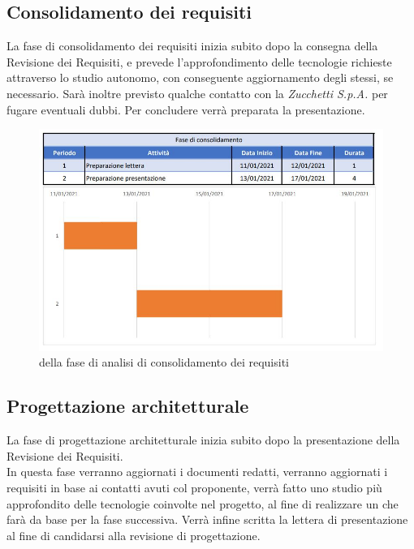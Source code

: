 \documentclass[../piano_di_progetto.tex]{subfiles}
\begin{document}
\subsection{Consolidamento dei requisiti}%
\label{sub:cons_req}
La fase di consolidamento dei requisiti inizia subito dopo la consegna della Revisione dei Requisiti, e prevede l’approfondimento delle tecnologie richieste attraverso lo studio autonomo, con conseguente aggiornamento degli stessi, se necessario. Sarà inoltre previsto qualche contatto con la \emph{Zucchetti S.p.A.} per fugare eventuali dubbi. Per concludere verrà preparata la presentazione. 
\begin{figure}[H]
\centering
\includegraphics[width=12cm]{componenti/img/fase_consolid}
\caption{  della fase di analisi di consolidamento dei requisiti}
\end{figure}

\subsection{Progettazione architetturale}%
\label{sub:prog_arc}
La fase di progettazione architetturale inizia subito dopo la presentazione della Revisione dei Requisiti.\\
In questa fase verranno aggiornati i documenti redatti, verranno aggiornati i requisiti in base ai contatti avuti col proponente, verrà fatto uno studio più approfondito delle tecnologie coinvolte nel progetto, al fine di realizzare un  che farà da base per la fase successiva. Verrà infine scritta la lettera di presentazione al fine di candidarsi alla revisione di progettazione.
\end{document}
